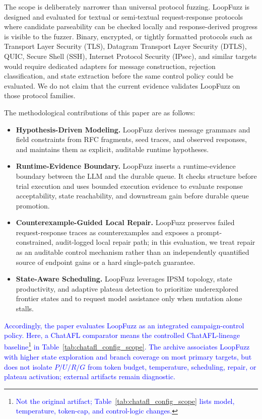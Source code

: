 \documentclass[final,5p,times,number]{elsarticle}
\begin{document}
The scope is deliberately narrower than universal protocol fuzzing. LoopFuzz is designed and evaluated for textual or semi-textual request-response protocols where candidate parseability can be checked locally and response-derived progress is visible to the fuzzer. Binary, encrypted, or tightly formatted protocols such as Transport Layer Security (TLS), Datagram Transport Layer Security (DTLS), QUIC, Secure Shell (SSH), Internet Protocol Security (IPsec), and similar targets would require dedicated adapters for message construction, rejection classification, and state extraction before the same control policy could be evaluated. We do not claim that the current evidence validates LoopFuzz on those protocol families.

The methodological contributions of this paper are as follows:
\begin{itemize}
    \item \textbf{Hypothesis-Driven Modeling.} LoopFuzz derives message grammars and field constraints from RFC fragments, seed traces, and observed responses, and maintains them as explicit, auditable runtime hypotheses.
    \item \textbf{Runtime-Evidence Boundary.} LoopFuzz inserts a runtime-evidence boundary between the LLM and the durable queue. It checks structure before trial execution and uses bounded execution evidence to evaluate response acceptability, state reachability, and downstream gain before durable queue promotion.
    \item \textbf{Counterexample-Guided Local Repair.} LoopFuzz preserves failed request-response traces as counterexamples and exposes a prompt-constrained, audit-logged local repair path; in this evaluation, we treat repair as an auditable control mechanism rather than an independently quantified source of endpoint gains or a hard single-patch guarantee.
    \item \textbf{State-Aware Scheduling.} LoopFuzz leverages IPSM topology, state productivity, and adaptive plateau detection to prioritize underexplored frontier states and to request model assistance only when mutation alone stalls.
\end{itemize}

\textcolor{blue}{Accordingly, the paper evaluates LoopFuzz as an integrated campaign-control policy. Here, a ChatAFL comparator means the controlled ChatAFL-lineage baseline\footnote{\textcolor{blue}{Not the original artifact; Table~\ref{tab:chatafl_config_scope} lists model, temperature, token-cap, and control-logic changes.}} in Table~\ref{tab:chatafl_config_scope}. The archive associates LoopFuzz with higher state exploration and branch coverage on most primary targets, but does not isolate $P/U/R/G$ from token budget, temperature, scheduling, repair, or plateau activation; external artifacts remain diagnostic.}
\end{document}
